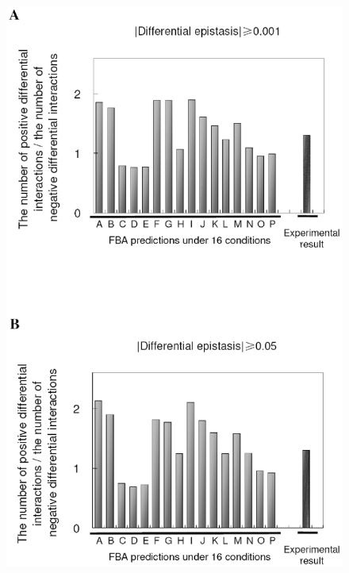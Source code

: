 \documentclass{article}
\begin{document}
\setcounter{figure}{0}                           %
\makeatletter                                    %
\renewcommand{\thefigure}{S\@arabic\c@figure}    %
\makeatother                                     %

\begin{figure}[H]
\caption{}
\label{fig:eefS1}
\centering
\includegraphics[height=0.97\textheight]{envFigure_S1}
\end{figure}
\end{document}

